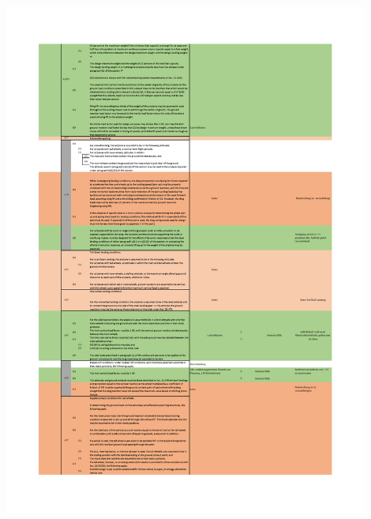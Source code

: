 \begin{table}[H]
\centering
\includegraphics[width=0.9\textwidth]{bilder/Tabellen/MPP_Konstruktion_7.pdf}
\end{table}

